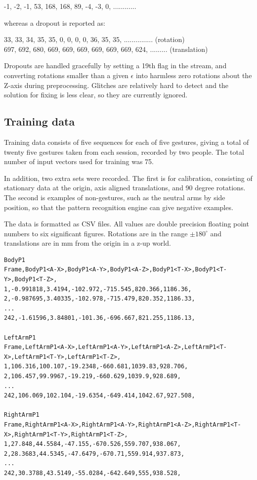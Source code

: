 \documentclass[12pt,a4,notitlepage]{report}
\renewcommand{\_}{\texttt{\symbol{95}}}
\newcommand{\<}{\texttt{\symbol{60}}}
\renewcommand{\>}{\texttt{\symbol{62}}}
\begin{document}
{-1, -2, -1, 53, 168, 168, 89, -4, -3, 0, ............

whereas a dropout is reported as:

33, 33, 34, 35, 35, 0, 0, 0, 0, 36, 35, 35, ............... (rotation) \\
697, 692, 680, 669, 669, 669, 669, 669, 669, 624, ......... (translation)

Dropouts are handled gracefully by setting a 19th flag in the stream, and converting rotations smaller than a given $\epsilon$ into harmless zero rotations about the Z-axis during preprocessing. Glitches are relatively hard to detect and the solution for fixing is less clear, so they are currently ignored.

\subsection{Training data}

Training data consists of five sequences for each of five gestures, giving a total of twenty five gestures taken from each session, recorded by two people. The total number of input vectors used for training was 75.

In addition, two extra sets were recorded. The first is for calibration, consisting of stationary data at the origin, axis aligned translations, and 90 degree rotations. The second is examples of non-gestures, such as the neutral arms by side position, so that the pattern recognition engine can give negative examples.

The data is formatted as CSV files. All values are double precision floating point numbers to six significant figures. Rotations are in the range $ \pm 180^{\circ}$ and translations are in mm from the origin in a z-up world.

{\scriptsize
\begin{verbatim}
BodyP1
Frame,BodyP1<A-X>,BodyP1<A-Y>,BodyP1<A-Z>,BodyP1<T-X>,BodyP1<T-Y>,BodyP1<T-Z>,
1,-0.991818,3.4194,-102.972,-715.545,820.366,1186.36,
2,-0.987695,3.40335,-102.978,-715.479,820.352,1186.33,
...
242,-1.61596,3.84801,-101.36,-696.667,821.255,1186.13,

LeftArmP1
Frame,LeftArmP1<A-X>,LeftArmP1<A-Y>,LeftArmP1<A-Z>,LeftArmP1<T-X>,LeftArmP1<T-Y>,LeftArmP1<T-Z>,
1,106.316,100.107,-19.2348,-660.681,1039.83,928.706,
2,106.457,99.9967,-19.219,-660.629,1039.9,928.689,
...
242,106.069,102.104,-19.6354,-649.414,1042.67,927.508,

RightArmP1
Frame,RightArmP1<A-X>,RightArmP1<A-Y>,RightArmP1<A-Z>,RightArmP1<T-X>,RightArmP1<T-Y>,RightArmP1<T-Z>,
1,27.848,44.5584,-47.155,-670.526,559.707,938.067,
2,28.3683,44.5345,-47.6479,-670.71,559.914,937.873,
...
242,30.3788,43.5149,-55.0284,-642.649,555,938.528,
\end{verbatim}
}


}
\end{document}
